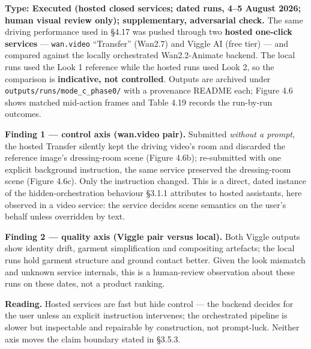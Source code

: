 \documentclass[10pt,twocolumn,letterpaper]{article}
\begin{document}
\textbf{Type: Executed (hosted closed services; dated runs, 4--5 August 2026; human visual review only); supplementary, adversarial check.} The same driving performance used in \S{}4.17 was pushed through two \textbf{hosted one-click services} --- \texttt{wan.video} ``Transfer'' (Wan2.7) and Viggle AI (free tier) --- and compared against the locally orchestrated Wan2.2-Animate backend. The local runs used the Look 1 reference while the hosted runs used Look 2, so the comparison is \textbf{indicative, not controlled}. Outputs are archived under \texttt{outputs/runs/mode\_c\_phase0/} with a provenance README each; Figure 4.6 shows matched mid-action frames and Table 4.19 records the run-by-run outcomes.

\textbf{Finding 1 --- control axis (wan.video pair).} Submitted \emph{without a prompt}, the hosted Transfer silently kept the driving video's room and discarded the reference image's dressing-room scene (Figure 4.6b); re-submitted with one explicit background instruction, the same service preserved the dressing-room scene (Figure 4.6c). Only the instruction changed. This is a direct, dated instance of the hidden-orchestration behaviour \S{}3.1.1 attributes to hosted assistants, here observed in a video service: the service decides scene semantics on the user's behalf unless overridden by text.

\textbf{Finding 2 --- quality axis (Viggle pair versus local).} Both Viggle outputs show identity drift, garment simplification and compositing artefacts; the local runs hold garment structure and ground contact better. Given the look mismatch and unknown service internals, this is a human-review observation about these runs on these dates, not a product ranking.

\textbf{Reading.} Hosted services are fast but hide control --- the backend decides for the user unless an explicit instruction intervenes; the orchestrated pipeline is slower but inspectable and repairable by construction, not prompt-luck. Neither axis moves the claim boundary stated in \S{}3.5.3.
\end{document}
